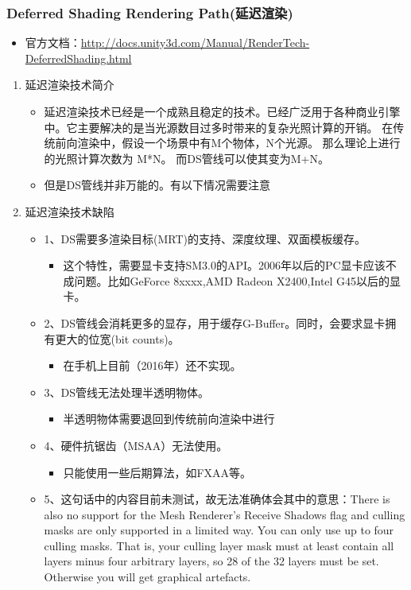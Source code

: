 \documentclass[9pt, b5paper]{article}
\begin{document}
\subsubsection{Deferred Shading Rendering Path(延迟渲染)}
\label{sec:org1e7df98}
\begin{itemize}
\item 官方文档：\url{http://docs.unity3d.com/Manual/RenderTech-DeferredShading.html}
\end{itemize}
\begin{enumerate}
\item 延迟渲染技术简介
\label{sec:org7192fd0}
\begin{itemize}
\item 延迟渲染技术已经是一个成熟且稳定的技术。已经广泛用于各种商业引擎中。它主要解决的是当光源数目过多时带来的复杂光照计算的开销。 在传统前向渲染中，假设一个场景中有M个物体，N个光源。 那么理论上进行的光照计算次数为 M*N。 而DS管线可以使其变为M+N。
\item 但是DS管线并非万能的。有以下情况需要注意
\end{itemize}
\item 延迟渲染技术缺陷
\label{sec:org3bb3835}
\begin{itemize}
\item 1、DS需要多渲染目标(MRT)的支持、深度纹理、双面模板缓存。
\begin{itemize}
\item 这个特性，需要显卡支持SM3.0的API。2006年以后的PC显卡应该不成问题。比如GeForce 8xxxx,AMD Radeon X2400,Intel G45以后的显卡。
\end{itemize}
\item 2、DS管线会消耗更多的显存，用于缓存G-Buffer。同时，会要求显卡拥有更大的位宽(bit counts)。
\begin{itemize}
\item 在手机上目前（2016年）还不实现。
\end{itemize}
\item 3、DS管线无法处理半透明物体。
\begin{itemize}
\item 半透明物体需要退回到传统前向渲染中进行
\end{itemize}
\item 4、硬件抗锯齿（MSAA）无法使用。
\begin{itemize}
\item 只能使用一些后期算法，如FXAA等。
\end{itemize}
\item 5、这句话中的内容目前未测试，故无法准确体会其中的意思：There is also no support for the Mesh Renderer’s Receive Shadows flag and culling masks are only supported in a limited way. You can only use up to four culling masks. That is, your culling layer mask must at least contain all layers minus four arbitrary layers, so 28 of the 32 layers must be set. Otherwise you will get graphical artefacts.

\end{itemize}
\end{enumerate}
\end{document}
